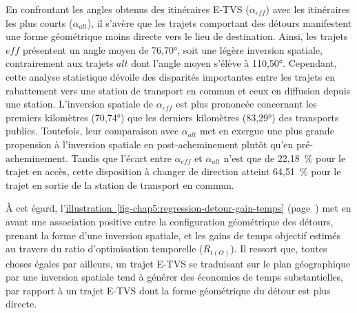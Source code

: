 \begin{refsegment}
En confrontant les angles obtenus des itinéraires \acrshort{E-TVS} ($\alpha_{eff}$) avec les itinéraires les plus courts ($\alpha_{alt}$), il s'avère que les trajets comportant des détours manifestent une forme géométrique moins directe vers le lieu de destination. Ainsi, les trajets \(eff\) présentent un angle moyen de 76,70°, soit une légère inversion spatiale, contrairement aux trajets \(alt\) dont l'angle moyen s'élève à 110,50°. Cependant, cette analyse statistique dévoile des disparités importantes entre les trajets en rabattement vers une station de transport en commun et ceux en diffusion depuis une station. L'inversion spatiale de $\alpha_{eff}$ est plus prononcée concernant les premiers kilomètres (70,74°) que les derniers kilomètres (83,29°) des transports publics. Toutefois, leur comparaison avec $\alpha_{alt}$ met en exergue une plus grande propension à l'inversion spatiale en post-acheminement plutôt qu'en pré-acheminement. Tandis que l'écart entre $\alpha_{eff}$ et $\alpha_{alt}$ n'est que de 22,18~\% pour le trajet en accès, cette disposition à changer de direction atteint 64,51~\% pour le trajet en sortie de la station de transport en commun.%

À cet égard, l'\hyperref[fig-chap5:regression-detour-gain-temps]{illustration~\ref{fig-chap5:regression-detour-gain-temps}} (page~\pageref{fig-chap5:regression-detour-gain-temps}) met en avant une association positive entre la configuration géométrique des détours, prenant la forme d'une inversion spatiale, et les gains de temps objectif estimés au travers du ratio d'optimisation temporelle (\(R_{t{(O)}}\)). Il ressort que, toutes choses égales par ailleurs, un trajet \acrshort{E-TVS} se traduisant sur le plan géographique par une inversion spatiale tend à générer des économies de temps substantielles, par rapport à un trajet \acrshort{E-TVS} dont la forme géométrique du détour est plus directe.%


\end{refsegment}

